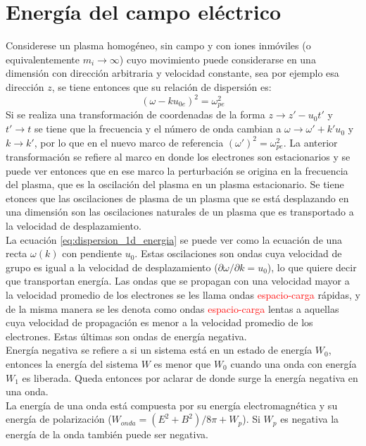\documentclass[../tesis_main_file.tex]{subfiles}
\begin{document}
\section{Energía del campo eléctrico}
Considerese un plasma homogéneo, sin campo y con iones inmóviles (o equivalentemente $m_i \rightarrow \infty$) cuyo movimiento puede considerarse en una dimensión con dirección arbitraria y velocidad constante, sea por ejemplo esa dirección $z$, se tiene entonces que su relación de dispersión es:
\begin{equation}
\label{eq:dispersion_1d_energia}
(\omega - ku_{0e})^2 = \omega_{pe}^2
\end{equation}
Si se realiza una transformación de coordenadas de la forma $z \rightarrow z'-u_0t'$ y $t' \rightarrow t$ se tiene que la frecuencia y el número de onda cambian a $\omega \rightarrow \omega' + k'u_0$ y $k \rightarrow k'$, por lo que en el nuevo marco de referencia $(\omega')^2=\omega_{pe}^2$. La anterior transformación se refiere al marco en donde los electrones son estacionarios y se puede ver entonces que en ese marco la perturbación se origina en la frecuencia del plasma, que es la oscilación del plasma en un plasma estacionario. Se tiene etonces que las oscilaciones de plasma de un plasma que se está desplazando en una dimensión son las oscilaciones naturales de un plasma que es transportado a la velocidad de desplazamiento. \cite{krall1973principles}\\
La ecuación \ref{eq:dispersion_1d_energia} se puede ver como la ecuación de una recta $\omega(k)$ con pendiente $u_0$. Estas oscilaciones son ondas cuya velocidad de grupo es igual a la velocidad de desplazamiento ($\partial \omega /\partial k=u_0$), lo que quiere decir que transportan energía. Las ondas que se propagan con una velocidad mayor a la velocidad promedio de los electrones se les llama ondas \textcolor{red}{espacio-carga} rápidas, y de la misma manera se les denota como ondas \textcolor{red}{espacio-carga} lentas a aquellas cuya velocidad de propagación es menor a la velocidad promedio de los electrones. Estas últimas son ondas de energía negativa.\\
Energía negativa se refiere a si un sistema está en un estado de energía $W_0$, entonces la energía del sistema $W$ es menor que $W_0$ cuando una onda con energía $W_1$ es liberada. Queda entonces por aclarar de donde surge la energía negativa en una onda.\\
La energía de una onda está compuesta por su energía electromagnética y su energía de polarización ($W_{onda}=(E^2 +B^2)/8\pi + W_p$). Si $W_p$ es negativa la energía de la onda también puede ser negativa.\\
\end{document}
